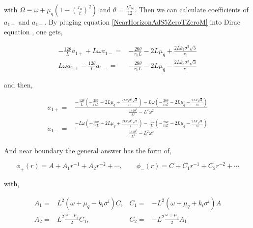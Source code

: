 with $\Omega \equiv \omega + \mu_q(1-(\frac{r_0}{r})^2)$ and $\theta = \frac{L^2\omega}{12}$. Then we can calculate coefficients of $a_{1+}$ and $a_{1-}$. By pluging equation \ref{NearHorizonAdS5ZeroTZeroM} into Dirac equation \label{DiracEqAdS5ZeroTZeroM},  one gets,

\begin{align}
   -\frac{12\theta}{L} a_{1+} + L\omega a_{1-} =& -\frac{28\theta}{r_0 L} - 2 L\mu_q + \frac{2Lk_3\sigma^3\sqrt{3}}{r_0} \nonumber\\
   L\omega  a_{1+} - \frac{12\theta}{L}  a_{1-} =& -\frac{28\theta}{r_0 L} - 2 L\mu_q - \frac{2Lk_3\sigma^3\sqrt{3}}{r_0}
\end{align}

and then,

\begin{align}
   a_{1+} =& \frac{ -\frac{12\theta}{L} \left(-\frac{28\theta}{r_0 L} - 2 L\mu_q + \frac{2Lk_3\sigma^3\sqrt{3}}{r_0} \right) -L\omega \left(-\frac{28\theta}{r_0 L} - 2 L\mu_q - \frac{2Lk\sqrt{3}}{r_0} \right) }{\frac{144\theta^2}{L^2} - L^2\omega^2 }  \nonumber\\
   a_{1-} =& \frac{ -L\omega \left(-\frac{28\theta}{r_0 L} - 2 L\mu_q + \frac{2Lk_3\sigma^3\sqrt{3}}{r_0} \right) - \frac{12\theta}{L} \left(-\frac{28\theta}{r_0 L} - 2 L\mu_q - \frac{2Lk\sqrt{3}}{r_0} \right) }{\frac{144\theta^2}{L^2} -  L^2\omega^2 }  \end{align}

And near boundary the general answer has the form of,

\begin{equation}
   \phi_{+}(r) = A + A_1r^{-1} + A_2r^{-2} + \cdots, \qquad \phi_{-}(r) = C + C_1r^{-1} + C_2r^{-2} + \cdots
\end{equation}

with,

\begin{align}
   A_1 =& L^2(\omega+\mu_q - k_i\sigma^i)C,& C_1 =& -L^2(\omega+\mu_q + k_i\sigma^i)A \nonumber\\
   A_2 =& L^2\frac{\omega+\mu_q}{2}C_1,& C_2 =& -L^2\frac{\omega+\mu_q}{2}A_1 
\end{align}

